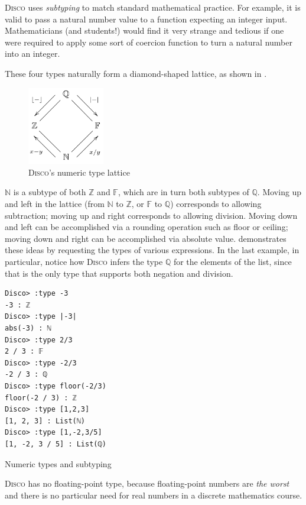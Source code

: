 \documentclass[submission,copyright,creativecommons]{eptcs}
\newcommand{\disco}{\textsc{Disco}\xspace}
\newcommand{\pref}[1]{\prettyref{#1}}
\newcommand{\N}{\mathbb{N}}
\newcommand{\Z}{\mathbb{Z}}
\newcommand{\F}{\mathbb{F}}
\newcommand{\Q}{\mathbb{Q}}
\begin{document}
\disco uses \emph{subtyping} to match standard mathematical practice.
For example, it is valid to pass a natural number value to a function
expecting an integer input.  Mathematicians (and students!) would find
it very strange and tedious if one were required to apply some sort of
coercion function to turn a natural number into an integer.

These four types naturally form a diamond-shaped lattice, as shown in
\pref{fig:lattice}.
\begin{figure}[htp]
  \centering
  \includegraphics[width=0.3\textwidth]{../../docs/images/diamond.png}
  \caption{\disco's numeric type lattice}
  \label{fig:lattice}
\end{figure}
$\N$ is a subtype of both $\Z$ and $\F$, which are in turn both
subtypes of $\Q$.  Moving up and left in the lattice (from $\N$ to
$\Z$, or $\F$ to $\Q$) corresponds to allowing subtraction; moving up
and right corresponds to allowing division.  Moving down and left can
be accomplished via a rounding operation such as floor or ceiling;
moving down and right can be accomplished via absolute
value. \pref{lst:subtype} demonstrates these ideas by requesting the
types of various expressions.  In the last example, in particular,
notice how \disco infers the type $\Q$ for the elements of the list,
since that is the only type that supports both negation and division.
\begin{listing}
\begin{verbatim}
Disco> :type -3
-3 : ℤ
Disco> :type |-3|
abs(-3) : ℕ
Disco> :type 2/3
2 / 3 : 𝔽
Disco> :type -2/3
-2 / 3 : ℚ
Disco> :type floor(-2/3)
floor(-2 / 3) : ℤ
Disco> :type [1,2,3]
[1, 2, 3] : List(ℕ)
Disco> :type [1,-2,3/5]
[1, -2, 3 / 5] : List(ℚ)
\end{verbatim}
\caption{Numeric types and subtyping}
\label{lst:subtype}
\end{listing}

\disco has no floating-point type, because floating-point numbers are
\emph{the worst} \cite{goldberg1991every} and there is no particular
need for real numbers in a discrete mathematics course.
\end{document}
